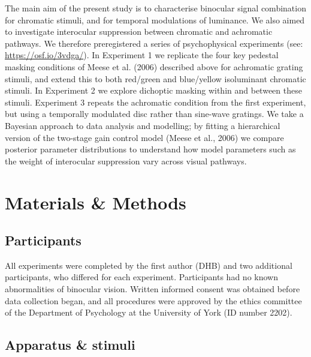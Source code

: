 \documentclass[
  letterpaper,
  DIV=11,
  numbers=noendperiod]{scrartcl}
\begin{document}
The main aim of the present study is to characterise binocular signal
combination for chromatic stimuli, and for temporal modulations of
luminance. We also aimed to investigate interocular suppression between
chromatic and achromatic pathways. We therefore preregistered a series
of psychophysical experiments (see: \url{https://osf.io/3vdga/}). In
Experiment 1 we replicate the four key pedestal masking conditions of
Meese et al. (2006) described above for achromatic grating stimuli, and
extend this to both red/green and blue/yellow isoluminant chromatic
stimuli. In Experiment 2 we explore dichoptic masking within and between
these stimuli. Experiment 3 repeats the achromatic condition from the
first experiment, but using a temporally modulated disc rather than
sine-wave gratings. We take a Bayesian approach to data analysis and
modelling; by fitting a hierarchical version of the two-stage gain
control model (Meese et al., 2006) we compare posterior parameter
distributions to understand how model parameters such as the weight of
interocular suppression vary across visual pathways.

\hypertarget{materials-methods}{%
\section{Materials \& Methods}\label{materials-methods}}

\hypertarget{participants}{%
\subsection{Participants}\label{participants}}

All experiments were completed by the first author (DHB) and two
additional participants, who differed for each experiment. Participants
had no known abnormalities of binocular vision. Written informed consent
was obtained before data collection began, and all procedures were
approved by the ethics committee of the Department of Psychology at the
University of York (ID number 2202).

\hypertarget{apparatus-stimuli}{%
\subsection{Apparatus \& stimuli}\label{apparatus-stimuli}}
\end{document}

